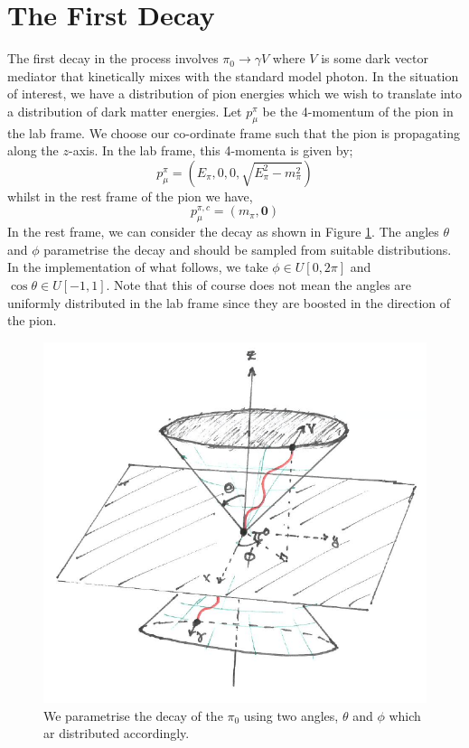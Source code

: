 \documentclass[10pt]{article}
\begin{document}
\section{The First Decay}
The first decay in the process involves $\pi_0 \rightarrow \gamma V$ where $V$ is some dark vector mediator that kinetically mixes with the standard model photon. In the situation of interest, we have a distribution of pion energies which we wish to translate into a distribution of dark matter energies. Let $p_\mu^\pi$ be the 4-momentum of the pion in the lab frame. We choose our co-ordinate frame such that the pion is propagating along the $z$-axis. In the lab frame, this 4-momenta is given by;
\begin{equation}
  p^\pi_\mu = (E_\pi, 0, 0, \sqrt{E_\pi^2 - m_\pi^2})
\end{equation}
whilst in the rest frame of the pion we have,
\begin{equation}
  p^{\pi, c}_\mu = (m_\pi, \mathbf{0})
\end{equation}
In the rest frame, we can consider the decay as shown in Figure \ref{fig:decay}. The angles $\theta$ and $\phi$ parametrise the decay and should be sampled from suitable distributions. In the implementation of what follows, we take $\phi \in U[0, 2\pi]$ and $\cos\theta \in U[-1, 1]$. Note that this of course does not mean the angles are uniformly distributed in the lab frame since they are boosted in the direction of the pion.
\begin{center}
\begin{figure}
  \centering
  \includegraphics[width=0.5\linewidth]{diag}
  \caption{We parametrise the decay of the $\pi_0$ using two angles, $\theta$ and $\phi$ which ar distributed accordingly.}
  \label{fig:decay}
\end{figure}
\end{center}
\end{document}
